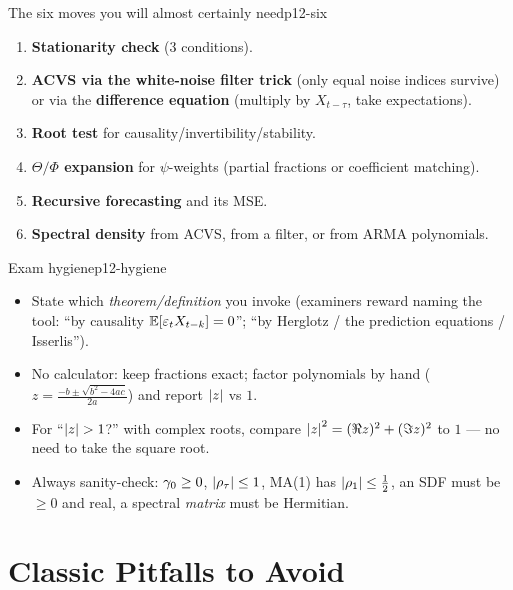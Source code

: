 \begin{keytech}{The six moves you will almost certainly need}{p12-six}
\begin{enumerate}
  \item \textbf{Stationarity check} (3 conditions).
  \item \textbf{ACVS via the white-noise filter trick} (only equal noise
        indices survive) or via the \textbf{difference equation} (multiply by
        $X_{t-\tau}$, take expectations).
  \item \textbf{Root test} for causality/invertibility/stability.
  \item \textbf{$\Theta/\Phi$ expansion} for $\psi$-weights (partial fractions
        or coefficient matching).
  \item \textbf{Recursive forecasting} and its MSE.
  \item \textbf{Spectral density} from ACVS, from a filter, or from ARMA
        polynomials.
\end{enumerate}
\end{keytech}

\begin{keytech}{Exam hygiene}{p12-hygiene}
\begin{itemize}
  \item State which \emph{theorem/definition} you invoke (examiners reward
        naming the tool: ``by causality $\mathbb{E}[\varepsilon_tX_{t-k}]=0$''; ``by Herglotz
        / the prediction equations / Isserlis'').
  \item No calculator: keep fractions exact; factor polynomials by hand
        ($z=\frac{-b\pm\sqrt{b^2-4ac}}{2a}$) and report $\left\lvert z \right\rvert$ vs $1$.
  \item For ``$\left\lvert z \right\rvert>1$?'' with complex roots, compare
        $\left\lvert z \right\rvert^2=(\Re z)^2+(\Im z)^2$ to $1$ --- no need to take the square
        root.
  \item Always sanity-check: $\gamma_0\ge0$, $\left\lvert \rho_\tau \right\rvert\le1$, MA(1) has
        $\left\lvert \rho_1 \right\rvert\le\tfrac12$, an SDF must be $\ge0$ and real, a spectral
        \emph{matrix} must be Hermitian.
\end{itemize}
\end{keytech}

\section{Classic Pitfalls to Avoid}
\label{sec:pitfalls}

